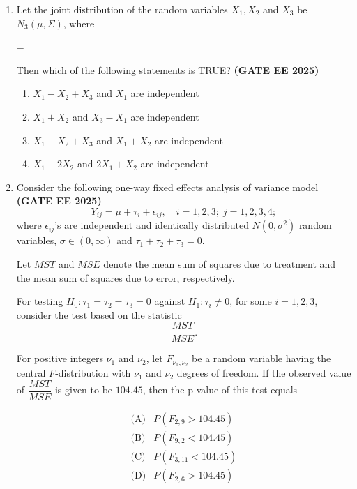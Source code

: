 \documentclass[journal,12pt,onecolumn]{IEEEtran}
\theoremstyle{remark}
\begin{document}
\begin{enumerate}
\item Let the joint distribution of the random variables $X_1, X_2$ and $X_3$ be 
$N_3(\mu, \Sigma)$, where 

\quad 
 = 

 Then which of the following statements is TRUE?  \hfill \textbf{(GATE EE 2025)}

\begin{enumerate}
    \item $X_1 - X_2 + X_3$ and $X_1$ are independent
    \item $X_1 + X_2$ and $X_3 - X_1$ are independent
    \item $X_1 - X_2 + X_3$ and $X_1 + X_2$ are independent
    \item $X_1 - 2X_2$ and $2X_1 + X_2$ are independent
\end{enumerate}

\item Consider the following one-way fixed effects analysis of variance model \hfill \textbf{(GATE EE 2025)}
\[
Y_{ij} = \mu + \tau_i + \epsilon_{ij}, \quad i = 1,2,3;\; j = 1,2,3,4;
\]
where $\epsilon_{ij}$'s are independent and identically distributed 
$N(0,\sigma^2)$ random variables, $\sigma \in (0,\infty)$ and $\tau_1 + \tau_2 + \tau_3 = 0$. 

Let $MST$ and $MSE$ denote the mean sum of squares due to treatment and the mean sum of squares due to error, respectively. 

For testing $H_0: \tau_1 = \tau_2 = \tau_3 = 0$ against $H_1: \tau_i \neq 0$, for some $i=1,2,3$, consider the test based on the statistic
\[
\frac{MST}{MSE}.
\]

For positive integers $\nu_1$ and $\nu_2$, let $F_{\nu_1, \nu_2}$ be a random variable having the central $F$-distribution with $\nu_1$ and $\nu_2$ degrees of freedom. If the observed value of $\dfrac{MST}{MSE}$ is given to be $104.45$, then the p-value of this test equals

\[
\begin{array}{ll}
\text{(A)} & P(F_{2,9} > 104.45) \\
\text{(B)} & P(F_{9,2} < 104.45) \\
\text{(C)} & P(F_{3,11} < 104.45) \\
\text{(D)} & P(F_{2,6} > 104.45) \\
\end{array}
\]


\end{enumerate}
\end{document}
